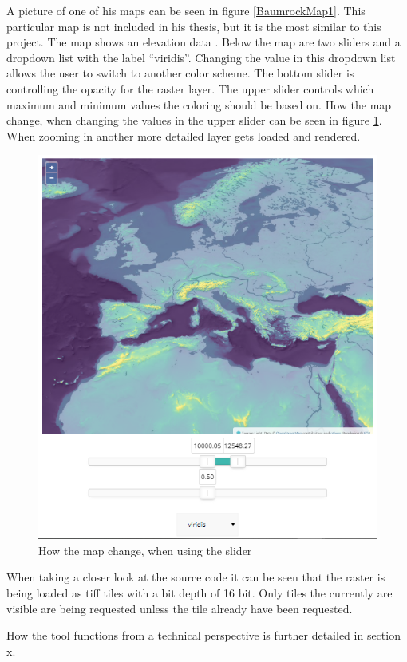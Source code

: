 A picture of one of his maps can be seen in figure \ref{BaumrockMap1}. This particular map is not included in his thesis, but it is the most similar to this project. The map shows an elevation data . Below the map are two sliders and a dropdown list with the label “viridis”. Changing the value in this dropdown list allows the user to switch to another color scheme. The bottom slider is controlling the opacity for the raster layer. The upper slider controls which maximum and minimum values the coloring should be based on. How the map change, when changing the values in the upper slider can be seen in figure \ref{BaumrockMap2}. When zooming in another more detailed layer gets loaded and rendered.
\begin{figure} [H]
	\centering
	\includegraphics[width=.8\textwidth]{Pictures/BaumrockMap2}
	\caption{How the map change, when using the slider}
	\label{BaumrockMap2}
\end{figure}


When taking a closer look at the source code it can be seen that the raster is being loaded as tiff tiles with a bit depth of 16 bit. \citep{EOX} Only tiles the currently are visible are being requested unless the tile already have been requested. \citep{Buamrocks}

How the tool functions from a technical perspective is further detailed in section x.
